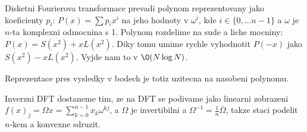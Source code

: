 \documentclass[a4paper,10pt,titlepage]{article} \usepackage[utf8]{inputenc}
\begin{document}
 \pagestyle{empty}
Disketni Fourierova transformace prevadi polynom reprezentovany jako koeficienty
$p_i$: $P(x)=\sum p_i x^i$ na jeho hodnoty v $\omega^i$, kde $i\in\{0,\ldots
n-1\}$ a $\omega$ je $n$-ta komplexni odmocnina s 1.
Polynom rozdelime na sude a liche mocniny: $P(x)=S(x^2)+xL(x^2)$. Diky tomu
umime rychle vyhodnotit $P(-x)$ jako $S(x^2)-xL(x^2)$.
Vyjde nam to v $\O(N\log N)$.

Reprezentace pres vysledky v bodech je totiz uzitecna na nasobeni polynomu.

Inverzni DFT dostaneme tim, ze na DFT se podivame jako linearni zobrazeni
$f(x)_j=\Omega x=\sum_{k=0}^{n-1} x_k \omega^{kj}$, a $\Omega$ je invertibilni
a $\Omega^{-1}=\frac{1}{n} \bar{\Omega}$, takze staci podelit $n$-kem a konvexne
sdruzit.
\end{document}
